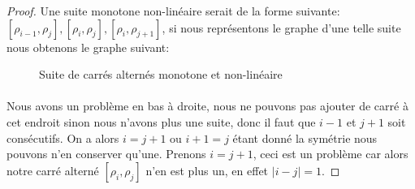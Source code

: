 \begin{proof}
  Une suite monotone non-linéaire serait de la forme suivante: $[\rho_{i-1}, \rho_j], [\rho_i, \rho_j], [\rho_i, \rho_{j+1}]$, si nous représentons le graphe d'une telle suite nous obtenons le graphe suivant:

  \begin{figure}[H]
    \begin{center}
      \caption{Suite de carrés alternés monotone et non-linéaire}
    \end{center}
  \end{figure}

  \paragraph{}
  Nous avons un problème en bas à droite, nous ne pouvons pas ajouter de carré à cet endroit sinon nous n'avons plus une suite, donc il faut que $i-1$ et $j+1$ soit consécutifs. On a alors $i = j+1$ ou $i+1=j$ étant donné la symétrie nous pouvons n'en conserver qu'une. Prenons $i = j+1$, ceci est un problème car alors notre carré alterné $[\rho_i, \rho_j]$ n'en est plus un, en effet $|i-j| = 1$.

\end{proof}

